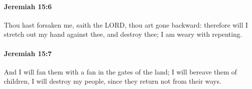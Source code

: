		\paragraph{Jeremiah 15:6} %
			\label{JEREMIAH-15-6}

			Thou hast forsaken me, saith the LORD, thou art gone backward: therefore will I stretch out my hand against thee, and destroy thee; I am weary with repenting.


		\paragraph{Jeremiah 15:7} %
			\label{JEREMIAH-15-7}

			And I will fan them with a fan in the gates of the land; I will bereave them of children, I will destroy my people, since they return not from their ways.


